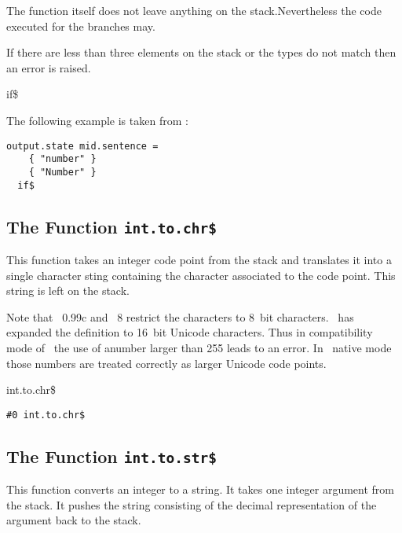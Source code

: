 The function itself does not leave anything on the stack.Nevertheless
the code executed for the branches may.

If there are less than three elements on the stack or the types do not
match then an error is raised.

\begin{BstFunction}{if\$}
\end{BstFunction}

The following example is taken from :

\begin{lstlisting}[language=bst]
    output.state mid.sentence =
    { "number" }
    { "Number" }
  if$
\end{lstlisting}

\subsection{The Function \texttt{int.to.chr\$}}%

This function takes an integer code point from the stack and
translates it into a single character sting containing the character
associated to the code point. This string is left on the stack.

Note that \BibTeX~0.99c and
\BibTeX~8 restrict the characters to 8~bit
characters. \ExBib\ has expanded the definition to 16~bit
Unicode characters. Thus in compatibility mode of
\ExBib\ the use of anumber larger than 255 leads to an error. In
\ExBib\ native mode those numbers are treated correctly as larger
Unicode code points.

\begin{BstFunction}{int.to.chr\$}
\end{BstFunction}

\begin{lstlisting}[language=bst]
  #0 int.to.chr$
\end{lstlisting}

\subsection{The Function \texttt{int.to.str\$}}%

This function converts an integer to a string. It takes one integer
argument from the stack. It pushes the string consisting of the
decimal representation of the argument back to the stack.

